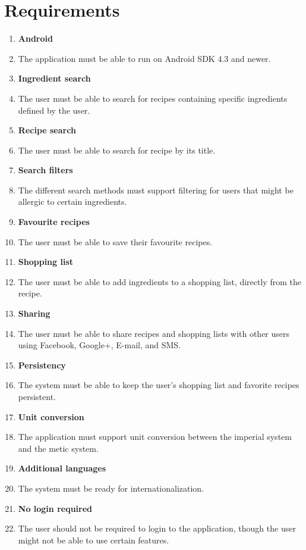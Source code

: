 \section{Requirements}
\begin{enumerate}
  \item\label{req:android} \textbf{Android} 
    \item [] The application must be able to run on Android SDK 4.3 and newer.
    
  \item\label{req:ingredientsearch} \textbf{Ingredient search} 
    \item [] The user must be able to search for recipes containing specific ingredients defined by the user.
    
  \item\label{req:recipesearch} \textbf{Recipe search} 
    \item [] The user must be able to search for recipe by its title.
    
  \item\label{req:searchfilters} \textbf{Search filters} 
    \item [] The different search methods must support filtering for users that might be allergic to certain ingredients.
    
  \item\label{req:favourite} \textbf{Favourite recipes} 
    \item [] The user must be able to save their favourite recipes.
    
  \item\label{req:shoppinglist} \textbf{Shopping list} 
    \item [] The user must be able to add ingredients to a shopping list, directly from the recipe.
    
  \item\label{req:sharing} \textbf{Sharing} 
    \item [] The user must be able to share recipes and shopping lists with other users using Facebook, Google+, E-mail, and SMS.
    
  \item\label{req:persistency} \textbf{Persistency} 
    \item [] The system must be able to keep the user's shopping list and favorite recipes persistent.
    
  \item\label{req:unitconversion} \textbf{Unit conversion} 
    \item [] The application must support unit conversion between the imperial system and the metic system.
    
  \item\label{req:additionallanguages} \textbf{Additional languages} 
    \item [] The system must be ready for internationalization.
  \item\label{req:Nologinrequired} \textbf{No login required}
    \item [] The user should not be required to login to the application, though the user might not be able to use certain features.
\end{enumerate}